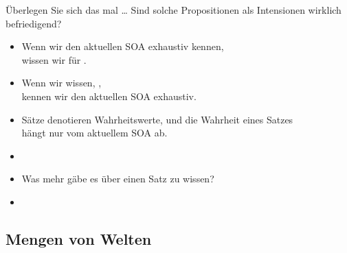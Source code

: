 \begin{frame}
  {Überlegen Sie sich das mal \ldots}
  \onslide<+->
  Sind solche Propositionen als Intensionen wirklich befriedigend?\\
  \Halbzeile
  \begin{itemize}[<+->]
    \item Wenn wir den \alert{aktuellen SOA exhaustiv} kennen,\\
      wissen wir für .
      \Halbzeile
    \item Wenn wir wissen, ,\\
      kennen wir den \alert{aktuellen SOA exhaustiv}.
      \Halbzeile
    \item Sätze denotieren Wahrheitswerte, und die Wahrheit eines Satzes\\
      hängt nur vom aktuellem SOA ab.
      \Viertelzeile
    \item[ ] \\
      \Viertelzeile
    \item Was mehr gäbe es über einen Satz zu wissen?
    \item {}
  \end{itemize}
\end{frame}


\subsection{Mengen von Welten}

